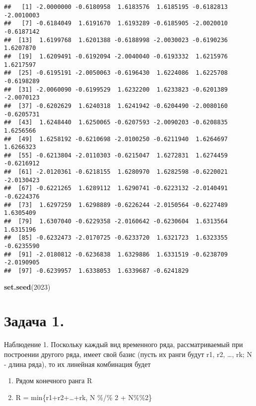 \documentclass[
]{article}
\newenvironment{Shaded}{\begin{snugshade}}{\end{snugshade}}
\newcommand{\DecValTok}[1]{\textcolor[rgb]{0.00,0.00,0.81}{#1}}
\newcommand{\FunctionTok}[1]{\textcolor[rgb]{0.13,0.29,0.53}{\textbf{#1}}}
\newcommand{\NormalTok}[1]{#1}
\providecommand{\tightlist}{%
  \setlength{\itemsep}{0pt}\setlength{\parskip}{0pt}}
\begin{document}
\begin{verbatim}
##   [1] -2.0000000 -0.6180958  1.6183576  1.6185195 -0.6182813 -2.0010003
##   [7] -0.6184049  1.6191670  1.6193289 -0.6185905 -2.0020010 -0.6187142
##  [13]  1.6199768  1.6201388 -0.6188998 -2.0030023 -0.6190236  1.6207870
##  [19]  1.6209491 -0.6192094 -2.0040040 -0.6193332  1.6215976  1.6217597
##  [25] -0.6195191 -2.0050063 -0.6196430  1.6224086  1.6225708 -0.6198289
##  [31] -2.0060090 -0.6199529  1.6232200  1.6233823 -0.6201389 -2.0070123
##  [37] -0.6202629  1.6240318  1.6241942 -0.6204490 -2.0080160 -0.6205731
##  [43]  1.6248440  1.6250065 -0.6207593 -2.0090203 -0.6208835  1.6256566
##  [49]  1.6258192 -0.6210698 -2.0100250 -0.6211940  1.6264697  1.6266323
##  [55] -0.6213804 -2.0110303 -0.6215047  1.6272831  1.6274459 -0.6216912
##  [61] -2.0120361 -0.6218155  1.6280970  1.6282598 -0.6220021 -2.0130423
##  [67] -0.6221265  1.6289112  1.6290741 -0.6223132 -2.0140491 -0.6224376
##  [73]  1.6297259  1.6298889 -0.6226244 -2.0150564 -0.6227489  1.6305409
##  [79]  1.6307040 -0.6229358 -2.0160642 -0.6230604  1.6313564  1.6315196
##  [85] -0.6232473 -2.0170725 -0.6233720  1.6321723  1.6323355 -0.6235590
##  [91] -2.0180812 -0.6236838  1.6329886  1.6331519 -0.6238709 -2.0190905
##  [97] -0.6239957  1.6338053  1.6339687 -0.6241829
\end{verbatim}

\begin{Shaded}
\begin{Highlighting}[]
\FunctionTok{set.seed}\NormalTok{(}\DecValTok{2023}\NormalTok{)}
\end{Highlighting}
\end{Shaded}

\section{Задача 1.}\label{ux437ux430ux434ux430ux447ux430-1.}

Наблюдение 1. Поскольку каждый вид временного ряда, рассматриваемый при
построении другого ряда, имеет свой базис (пусть их ранги будут r1, r2,
\ldots, rk; N - длина ряда), то их линейная комбинация будет

\begin{enumerate}
\def\labelenumi{\arabic{enumi}.}
\tightlist
\item
  Рядом конечного ранга R
\item
  R = min\{r1+r2+\ldots+rk, N \%/\% 2 + N\%\%2\}
\end{enumerate}
\end{document}
